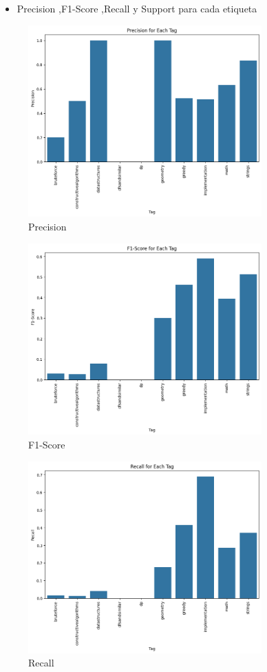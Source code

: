 \documentclass{article}
\begin{document}
\begin{itemize}
    	\item Precision ,F1-Score ,Recall y Support para cada etiqueta
\end{itemize}
\begin{figure}[H]
    \centering
    \includegraphics[width=0.8\textwidth]{imgs/precisonnb.png}
    \caption{Precision}
    \label{fig:p}
\end{figure}
\newpage
\begin{figure}[H]
    \centering
    \includegraphics[width=0.8\textwidth]{imgs/f1nb.png}
    \caption{F1-Score}
    \label{fig:f1}
\end{figure}
\begin{figure}[H]
    \centering
    \includegraphics[width=0.8\textwidth]{imgs/recallnb.png}
    \caption{Recall}
    \label{fig:r}
\end{figure}
\end{document}
